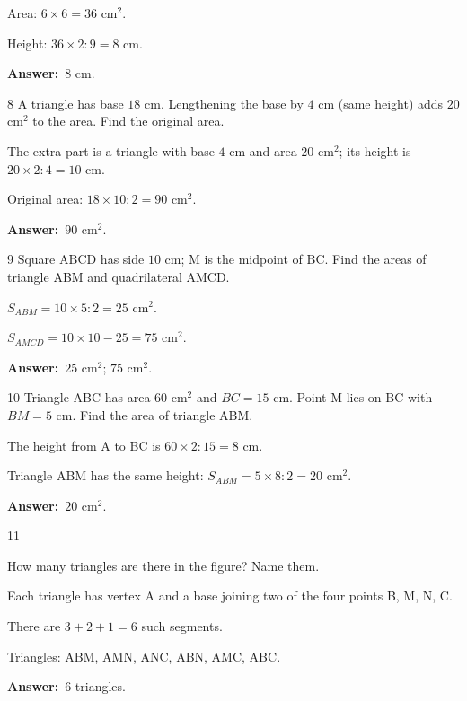 \documentclass[11pt]{article}
\newif\ifsol \solfalse
\providecommand{\AnsWord}{Đáp số}
\newcommand{\dapso}[1]{\par\textbf{\AnsWord:}\ #1}
\newcommand{\probsol}[1]{%
  \begin{lrbox}{\solmeasure}\begin{minipage}{\dimexpr\linewidth-24pt\relax}#1\end{minipage}\end{lrbox}%
  \ifsol
    \begin{solbox}#1\end{solbox}%
  \else
    \setlength{\solht}{\dimexpr\ht\solmeasure+\dp\solmeasure+0.85cm\relax}%
    \ifdim\solht<1.35cm\setlength{\solht}{1.35cm}\fi
    \begin{tcolorbox}[colback=white,colframe=Line,boxrule=0.8pt,arc=5pt,
      left=8pt,right=8pt,top=4pt,bottom=4pt,height=\solht]{\footnotesize\color{Slate}\itshape\WorkWord}\end{tcolorbox}%
  \fi}
\newcommand{\gap}{\vspace{0.3cm}}
\def\WorkWord{Your work:}
\def\AnsWord{Answer}
\begin{document}
\probsol{
Area: $6\times6=36$ cm$^2$.\par Height: $36\times2:9=8$ cm.
\dapso{$8$ cm.}}
\gap
\begin{probbox}{8}{\relax}
A triangle has base $18$ cm. Lengthening the base by $4$ cm (same height) adds $20$ cm$^2$ to the area. Find the original area.
\end{probbox}
\probsol{
The extra part is a triangle with base $4$ cm and area $20$ cm$^2$; its height is $20\times2:4=10$ cm.\par
Original area: $18\times10:2=90$ cm$^2$.
\dapso{$90$ cm$^2$.}}
\gap
\begin{probbox}{9}{\relax}
Square ABCD has side $10$ cm; M is the midpoint of BC. Find the areas of triangle ABM and quadrilateral AMCD.
\end{probbox}
\probsol{
$S_{ABM}=10\times5:2=25$ cm$^2$.\par $S_{AMCD}=10\times10-25=75$ cm$^2$.
\dapso{$25$ cm$^2$; $75$ cm$^2$.}}
\gap
\begin{probbox}{10}{\relax}
Triangle ABC has area $60$ cm$^2$ and $BC=15$ cm. Point M lies on BC with $BM=5$ cm. Find the area of triangle ABM.
\end{probbox}
\probsol{
The height from A to BC is $60\times2:15=8$ cm.\par Triangle ABM has the same height: $S_{ABM}=5\times8:2=20$ cm$^2$.
\dapso{$20$ cm$^2$.}}
\gap
\begin{probbox}{11}{\relax}
\begin{minipage}[t]{0.62\linewidth}
How many triangles are there in the figure? Name them.
\end{minipage}\hfill
\begin{minipage}[t]{0.34\linewidth}\vspace{0pt}\centering
{}
\end{minipage}
\end{probbox}
\probsol{
Each triangle has vertex A and a base joining two of the four points B, M, N, C.\par There are $3+2+1=6$ such segments.\par
Triangles: ABM, AMN, ANC, ABN, AMC, ABC.
\dapso{$6$ triangles.}}
\end{document}
